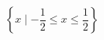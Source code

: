 \documentclass{ltjsarticle}
\begin{document}
\[ \left\{ x \mid -\frac{1}{2} \leq x \leq \frac{1}{2} \right\} \]
\end{document}
